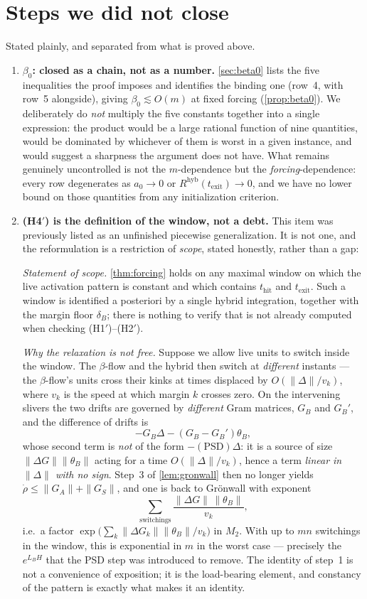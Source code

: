 \documentclass[11pt]{article}
\theoremstyle{definition}
\theoremstyle{remark}
\newcommand{\hyb}{\mathrm{hyb}}
\newcommand{\thit}{t_{\mathrm{hit}}}
\newcommand{\texit}{t_{\mathrm{exit}}}
\begin{document}
\section{Steps we did not close}\label{sec:open}

Stated plainly, and separated from what is proved above.

\begin{enumerate}
\item[(O1)] \textbf{$\beta_0$: closed as a chain, not as a number.}
\cref{sec:beta0} lists the five inequalities the proof imposes and identifies the
binding one (row~4, with row~5 alongside), giving $\beta_0\lesssim O(m)$ at fixed
forcing (\cref{prop:beta0}). We deliberately do \emph{not} multiply the five
constants together into a single expression: the product would be a large
rational function of nine quantities, would be dominated by whichever of them is
worst in a given instance, and would suggest a sharpness the argument does not
have. What remains genuinely uncontrolled is not the $m$-dependence but the
\emph{forcing}-dependence: every row degenerates as $a_0\to0$ or
$R^{\hyb}(\texit)\to0$, and we have no lower bound on those quantities from any
initialization criterion.
\item[(O2)] \textbf{(H4$'$) is the definition of the window, not a debt.}
This item was previously listed as an unfinished piecewise generalization. It is
not one, and the reformulation is a restriction of \emph{scope}, stated
honestly, rather than a gap:

\emph{Statement of scope.} \cref{thm:forcing} holds on any maximal window on
which the live activation pattern is constant and which contains $\thit$ and
$\texit$. Such a window is identified a posteriori by a single hybrid
integration, together with the margin floor $\delta_B$; there is nothing to
verify that is not already computed when checking (H1$'$)--(H2$'$).

\emph{Why the relaxation is not free.} Suppose we allow live units to switch
inside the window. The $\beta$-flow and the hybrid then switch at
\emph{different} instants --- the $\beta$-flow's units cross their kinks at times
displaced by $O(\|\Delta\|/v_k)$, where $v_k$ is the speed at which margin $k$
crosses zero. On the intervening slivers the two drifts are governed by
\emph{different} Gram matrices, $G_B$ and $G_B'$, and the difference of drifts is
\[
-G_B\Delta-(G_B-G_B')\theta_B ,
\]
whose second term is \emph{not} of the form $-(\text{PSD})\Delta$: it is a source
of size $\|\Delta G\|\|\theta_B\|$ acting for a time $O(\|\Delta\|/v_k)$, hence a
term \emph{linear in $\|\Delta\|$ with no sign}. Step~3 of \cref{lem:gronwall}
then no longer yields $\dot\rho\le\|G_A\|+\|G_S\|$, and one is back to Gr\"onwall
with exponent
\[
\sum_{\text{switchings}}\frac{\|\Delta G\|\,\|\theta_B\|}{v_k},
\]
i.e.\ a factor $\exp\bigl(\sum_k\|\Delta G_k\|\|\theta_B\|/v_k\bigr)$ in $M_2$.
With up to $mn$ switchings in the window, this is exponential in $m$ in the worst
case --- precisely the $e^{L_BH}$ that the PSD step was introduced to remove. The
identity of step~1 is not a convenience of exposition; it is the load-bearing
element, and constancy of the pattern is exactly what makes it an identity.


\end{enumerate}
\end{document}
